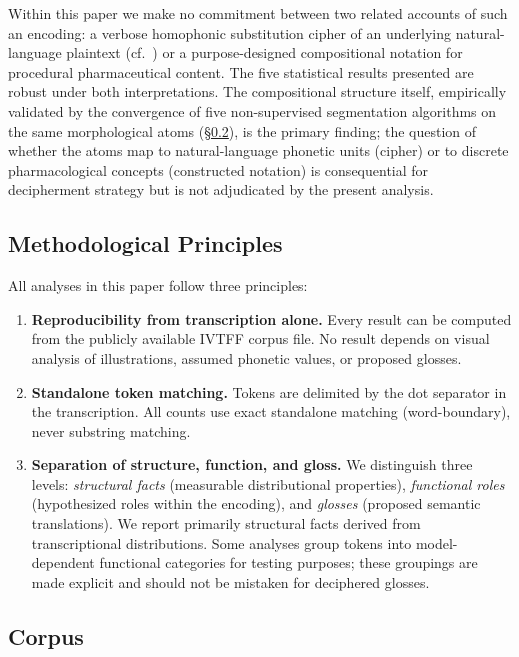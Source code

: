 \documentclass[11pt,a4paper]{article}
\begin{document}
Within this paper we make no commitment between two related accounts of such an encoding: a verbose homophonic substitution cipher of an underlying natural-language plaintext (cf.\ \citealp{Greshko2025}) or a purpose-designed compositional notation for procedural pharmaceutical content. The five statistical results presented are robust under both interpretations. The compositional structure itself, empirically validated by the convergence of five non-supervised segmentation algorithms on the same morphological atoms (\S\ref{sec:corpus}), is the primary finding; the question of whether the atoms map to natural-language phonetic units (cipher) or to discrete pharmacological concepts (constructed notation) is consequential for decipherment strategy but is not adjudicated by the present analysis.

\subsection{Methodological Principles}

All analyses in this paper follow three principles:

\begin{enumerate}[leftmargin=*,itemsep=4pt]
\item \textbf{Reproducibility from transcription alone.} Every result can be computed from the publicly available IVTFF corpus file. No result depends on visual analysis of illustrations, assumed phonetic values, or proposed glosses.

\item \textbf{Standalone token matching.} Tokens are delimited by the dot separator in the transcription. All counts use exact standalone matching (word-boundary), never substring matching.

\item \textbf{Separation of structure, function, and gloss.} We distinguish three levels: \textit{structural facts} (measurable distributional properties), \textit{functional roles} (hypothesized roles within the encoding), and \textit{glosses} (proposed semantic translations). We report primarily structural facts derived from transcriptional distributions. Some analyses group tokens into model-dependent functional categories for testing purposes; these groupings are made explicit and should not be mistaken for deciphered glosses.
\end{enumerate}

\subsection{Corpus}\label{sec:corpus}
\end{document}
